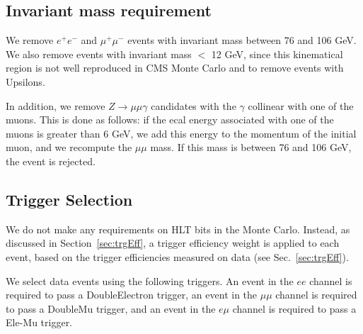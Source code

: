 \subsection{Invariant mass requirement}
\label{sec:zveto}

We remove $e^+e^-$ and $\mu^+ \mu^-$ events with invariant 
mass between 76 and 106 GeV.  We also remove events
with invariant mass $<$ 12 GeV, since this kinematical region is 
not well reproduced in CMS Monte Carlo and to remove events with Upsilons.

In addition, we remove $Z \to \mu\mu\gamma$
candidates with the $\gamma$ collinear with one of the muons.  This is
done as follows:
if the ecal energy associated with one of the muons is greater than 6 GeV,
we add this energy to the momentum of the initial muon, and we recompute
the $\mu\mu$ mass.  If this mass is between 76 and 106 GeV, the event is rejected.


\subsection{Trigger Selection}
\label{sec:trigSel}

We do not make any requirements on HLT bits in the Monte Carlo.
Instead, as discussed in 
Section~\ref{sec:trgEff}, a trigger efficiency weight is applied
to each event, based on the trigger efficiencies measured on data (see Sec.~\ref{sec:trgEff}).

We select data events using the following triggers. An event in the $ee$ channel is required
to pass a DoubleElectron trigger, an event in the $\mu\mu$ channel is required to pass a 
DoubleMu trigger, and an event in the $e\mu$ channel is required to pass a Ele-Mu trigger.

